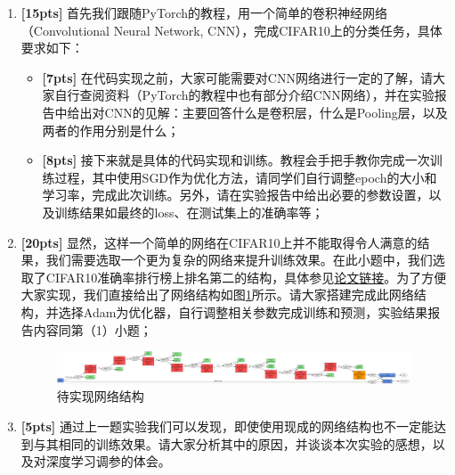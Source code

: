 \documentclass[a4paper,UTF8]{article}
\numberwithin{equation}{section}
\begin{document}
\begin{enumerate}[(1)]
	\item \textbf{[15pts]} 首先我们跟随PyTorch的教程，用一个简单的卷积神经网络（Convolutional Neural Network, CNN），完成CIFAR10上的分类任务，具体要求如下：
	
	\begin{itemize}
		\item \textbf{[7pts]} 在代码实现之前，大家可能需要对CNN网络进行一定的了解，请大家自行查阅资料（PyTorch的教程中也有部分介绍CNN网络），并在实验报告中给出对CNN的见解：主要回答什么是卷积层，什么是Pooling层，以及两者的作用分别是什么；
		\item \textbf{[8pts]} 接下来就是具体的代码实现和训练。教程会手把手教你完成一次训练过程，其中使用SGD作为优化方法，请同学们自行调整epoch的大小和学习率，完成此次训练。另外，请在实验报告中给出必要的参数设置，以及训练结果如最终的loss、在测试集上的准确率等；
	\end{itemize}
	\item \textbf{[20pts]} 显然，这样一个简单的网络在CIFAR10上并不能取得令人满意的结果，我们需要选取一个更为复杂的网络来提升训练效果。在此小题中，我们选取了CIFAR10准确率排行榜上排名第二的结构，具体参见\href{https://arxiv.org/pdf/1412.6806.pdf}{论文链接}。为了方便大家实现，我们直接给出了网络结构如图\ref{network_structure}所示。请大家搭建完成此网络结构，并选择Adam为优化器，自行调整相关参数完成训练和预测，实验结果报告内容同第（1）小题；
	\begin{figure}[!h]
		\centering   
		\includegraphics[width=0.99\textwidth, height=0.15\textwidth]{nn_structure.png}  
		\caption{待实现网络结构} 
		\label{network_structure}
	\end{figure}
	\item \textbf{[5pts]} 通过上一题实验我们可以发现，即使使用现成的网络结构也不一定能达到与其相同的训练效果。请大家分析其中的原因，并谈谈本次实验的感想，以及对深度学习调参的体会。
\end{enumerate}

\end{document}
